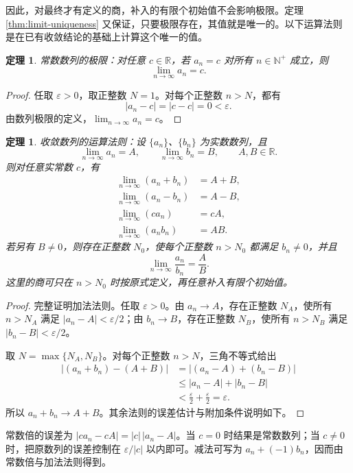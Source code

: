 \documentclass[UTF8,fontset=fandol,11pt]{ctexart}
\newtheorem{theorem}[definition]{定理}
\begin{document}
因此，对最终才有定义的商，补入的有限个初始值不会影响极限。定理 \ref{thm:limit-uniqueness} 又保证，只要极限存在，其值就是唯一的。以下运算法则是在已有收敛结论的基础上计算这个唯一的值。\par
\begin{theorem}
常数数列的极限：对任意 $c\in\mathbb{R}$，若 $a_n=c$ 对所有 $n\in\mathbb{N}^+$ 成立，则
\[
\lim_{n\to\infty}a_n=c.
\]
\end{theorem}
\begin{proof}
任取 $\varepsilon>0$，取正整数 $N=1$。对每个正整数 $n>N$，都有
\[
|a_n-c|=|c-c|=0<\varepsilon.
\]
由数列极限的定义，$\lim_{n\to\infty}a_n=c$。
\end{proof}
\begin{theorem}
收敛数列的运算法则：设 $\{a_n\}$、$\{b_n\}$ 为实数数列，且
\[
\lim_{n\to\infty}a_n=A,\qquad \lim_{n\to\infty}b_n=B,
\qquad A,B\in\mathbb{R}.
\]
则对任意实常数 $c$，有
\[
\begin{aligned}
\lim_{n\to\infty}(a_n+b_n)&=A+B,\\
\lim_{n\to\infty}(a_n-b_n)&=A-B,\\
\lim_{n\to\infty}(ca_n)&=cA,\\
\lim_{n\to\infty}(a_nb_n)&=AB.
\end{aligned}
\]
若另有 $B\ne0$，则存在正整数 $N_0$，使每个正整数 $n>N_0$ 都满足 $b_n\ne0$，并且
\[
\lim_{n\to\infty}\frac{a_n}{b_n}=\frac{A}{B}.
\]
这里的商可只在 $n>N_0$ 时按原式定义，再任意补入有限个初始值。
\end{theorem}
\begin{proof}
完整证明加法法则。任取 $\varepsilon>0$。由 $a_n\to A$，存在正整数 $N_A$，使所有 $n>N_A$ 满足 $|a_n-A|<\varepsilon/2$；由 $b_n\to B$，存在正整数 $N_B$，使所有 $n>N_B$ 满足 $|b_n-B|<\varepsilon/2$。

取 $N=\max\{N_A,N_B\}$。对每个正整数 $n>N$，三角不等式给出
\[
\begin{aligned}
|(a_n+b_n)-(A+B)|
&=|(a_n-A)+(b_n-B)|\\
&\leq |a_n-A|+|b_n-B|\\
&<\frac{\varepsilon}{2}+\frac{\varepsilon}{2}=\varepsilon.
\end{aligned}
\]
所以 $a_n+b_n\to A+B$。其余法则的误差估计与附加条件说明如下。
\end{proof}
常数倍的误差为 $|ca_n-cA|=|c|\,|a_n-A|$。当 $c=0$ 时结果是常数数列；当 $c\ne0$ 时，把原数列的误差控制在 $\varepsilon/|c|$ 以内即可。减法可写为 $a_n+(-1)b_n$，因而由常数倍与加法法则得到。
\end{document}
